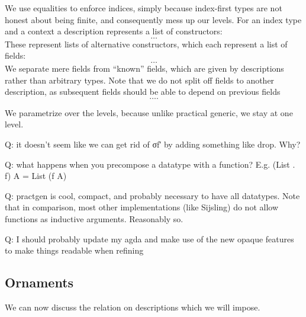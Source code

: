 We use equalities to enforce indices, simply because index-first types are not honest about being finite, and consequently mess up our levels. For an index type and a context a description represents a list of constructors:
\[ \dots \]
These represent lists of alternative constructors, which each represent a list of fields:
\[ \dots \]
We separate mere fields from ``known'' fields, which are given by descriptions rather than arbitrary types. Note that we do not split off fields to another description, as subsequent fields should be able to depend on previous fields
\[ \dots. \]


We parametrize over the levels, because unlike practical generic, we stay at one level.

Q: it doesn't seem like we can get rid of σf′ by adding something like drop. Why?

Q: what happens when you precompose a datatype with a function? E.g. (List . f) A = List (f A) 

Q: practgen is cool, compact, and probably necessary to have all datatypes. Note that in comparison, most other implementations (like Sijsling) do not allow functions as inductive arguments. Reasonably so.

Q: I should probably update my agda and make use of the new opaque features to make things readable when refining

\subsection{Ornaments}
We can now discuss the relation on descriptions which we will impose.


